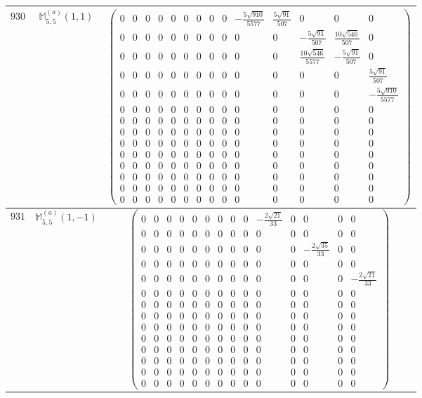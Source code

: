 \documentclass[fleqn,8pt,landscape]{jsarticle}
\begin{document}
\begin{center}
\begin{longtable}{ccc}
$ 930 $ & $ \mathbb{M}_{5,5}^{(a)}(1,1) $ & $ \begin{pmatrix} 0 & 0 & 0 & 0 & 0 & 0 & 0 & 0 & 0 & - \frac{5 \sqrt{910}}{5577} & \frac{5 \sqrt{91}}{507} & 0 & 0 & 0 \\ 0 & 0 & 0 & 0 & 0 & 0 & 0 & 0 & 0 & 0 & 0 & - \frac{5 \sqrt{91}}{507} & \frac{10 \sqrt{546}}{507} & 0 \\ 0 & 0 & 0 & 0 & 0 & 0 & 0 & 0 & 0 & 0 & 0 & \frac{10 \sqrt{546}}{5577} & - \frac{5 \sqrt{91}}{507} & 0 \\ 0 & 0 & 0 & 0 & 0 & 0 & 0 & 0 & 0 & 0 & 0 & 0 & 0 & \frac{5 \sqrt{91}}{507} \\ 0 & 0 & 0 & 0 & 0 & 0 & 0 & 0 & 0 & 0 & 0 & 0 & 0 & - \frac{5 \sqrt{910}}{5577} \\ 0 & 0 & 0 & 0 & 0 & 0 & 0 & 0 & 0 & 0 & 0 & 0 & 0 & 0 \\ 0 & 0 & 0 & 0 & 0 & 0 & 0 & 0 & 0 & 0 & 0 & 0 & 0 & 0 \\ 0 & 0 & 0 & 0 & 0 & 0 & 0 & 0 & 0 & 0 & 0 & 0 & 0 & 0 \\ 0 & 0 & 0 & 0 & 0 & 0 & 0 & 0 & 0 & 0 & 0 & 0 & 0 & 0 \\ 0 & 0 & 0 & 0 & 0 & 0 & 0 & 0 & 0 & 0 & 0 & 0 & 0 & 0 \\ 0 & 0 & 0 & 0 & 0 & 0 & 0 & 0 & 0 & 0 & 0 & 0 & 0 & 0 \\ 0 & 0 & 0 & 0 & 0 & 0 & 0 & 0 & 0 & 0 & 0 & 0 & 0 & 0 \\ 0 & 0 & 0 & 0 & 0 & 0 & 0 & 0 & 0 & 0 & 0 & 0 & 0 & 0 \\ 0 & 0 & 0 & 0 & 0 & 0 & 0 & 0 & 0 & 0 & 0 & 0 & 0 & 0 \end{pmatrix} $ \\ \hline
$ 931 $ & $ \mathbb{M}_{5,5}^{(a)}(1,-1) $ & $ \begin{pmatrix} 0 & 0 & 0 & 0 & 0 & 0 & 0 & 0 & 0 & - \frac{2 \sqrt{21}}{33} & 0 & 0 & 0 & 0 \\ 0 & 0 & 0 & 0 & 0 & 0 & 0 & 0 & 0 & 0 & 0 & 0 & 0 & 0 \\ 0 & 0 & 0 & 0 & 0 & 0 & 0 & 0 & 0 & 0 & 0 & - \frac{2 \sqrt{35}}{33} & 0 & 0 \\ 0 & 0 & 0 & 0 & 0 & 0 & 0 & 0 & 0 & 0 & 0 & 0 & 0 & 0 \\ 0 & 0 & 0 & 0 & 0 & 0 & 0 & 0 & 0 & 0 & 0 & 0 & 0 & - \frac{2 \sqrt{21}}{33} \\ 0 & 0 & 0 & 0 & 0 & 0 & 0 & 0 & 0 & 0 & 0 & 0 & 0 & 0 \\ 0 & 0 & 0 & 0 & 0 & 0 & 0 & 0 & 0 & 0 & 0 & 0 & 0 & 0 \\ 0 & 0 & 0 & 0 & 0 & 0 & 0 & 0 & 0 & 0 & 0 & 0 & 0 & 0 \\ 0 & 0 & 0 & 0 & 0 & 0 & 0 & 0 & 0 & 0 & 0 & 0 & 0 & 0 \\ 0 & 0 & 0 & 0 & 0 & 0 & 0 & 0 & 0 & 0 & 0 & 0 & 0 & 0 \\ 0 & 0 & 0 & 0 & 0 & 0 & 0 & 0 & 0 & 0 & 0 & 0 & 0 & 0 \\ 0 & 0 & 0 & 0 & 0 & 0 & 0 & 0 & 0 & 0 & 0 & 0 & 0 & 0 \\ 0 & 0 & 0 & 0 & 0 & 0 & 0 & 0 & 0 & 0 & 0 & 0 & 0 & 0 \\ 0 & 0 & 0 & 0 & 0 & 0 & 0 & 0 & 0 & 0 & 0 & 0 & 0 & 0 \end{pmatrix} $ \\ \hline

\end{longtable}
\end{center}
\end{document}
